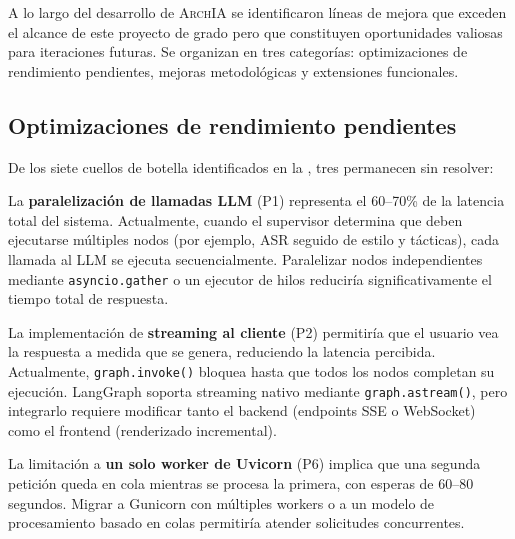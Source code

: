 \documentclass[12pt, letterpaper, oneside]{article}
\newcommand{\archia}{\textsc{ArchIA}}
\begin{document}

A lo largo del desarrollo de \archia{} se identificaron líneas de mejora que exceden
el alcance de este proyecto de grado pero que constituyen oportunidades valiosas
para iteraciones futuras. Se organizan en tres categorías: optimizaciones de
rendimiento pendientes, mejoras metodológicas y extensiones funcionales.

\subsection*{Optimizaciones de rendimiento pendientes}

De los siete cuellos de botella identificados en la ,
tres permanecen sin resolver:

La \textbf{paralelización de llamadas LLM} (P1) representa el 60--70\% de la
latencia total del sistema. Actualmente, cuando el supervisor determina que deben
ejecutarse múltiples nodos (por ejemplo, ASR seguido de estilo y tácticas), cada
llamada al LLM se ejecuta secuencialmente. Paralelizar nodos independientes
mediante \texttt{asyncio.gather} o un ejecutor de hilos reduciría
significativamente el tiempo total de respuesta.

La implementación de \textbf{streaming al cliente} (P2) permitiría que el usuario
vea la respuesta a medida que se genera, reduciendo la latencia percibida.
Actualmente, \texttt{graph.invoke()} bloquea hasta que todos los nodos completan
su ejecución. LangGraph soporta streaming nativo mediante \texttt{graph.astream()},
pero integrarlo requiere modificar tanto el backend (endpoints SSE o WebSocket)
como el frontend (renderizado incremental).

La limitación a \textbf{un solo worker de Uvicorn} (P6) implica que una segunda
petición queda en cola mientras se procesa la primera, con esperas de 60--80
segundos. Migrar a Gunicorn con múltiples workers o a un modelo de procesamiento
basado en colas permitiría atender solicitudes concurrentes.
\end{document}
